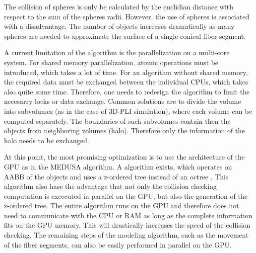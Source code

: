 The collision of spheres is only be calculated by the euclidian distance with respect to the sum of the spheres radii.
However, the use of spheres is associated with a disadvantage.
The number of objects increases dramatically as many spheres are needed to approximate the surface of a single conical fiber segment.
\par
% 
A current limitation of the algorithm is the parallelization on a multi-core system.
For shared memory parallelization, atomic operations must be introduced, which takes a lot of time.
For an algorithm without shared memory, the required data must be exchanged between the individual CPUs, which takes also quite some time. 
Therefore, one needs to redesign the algorithm to limit the necesarry locks or data exchange.
Common solutions are to divide the volume into subvolumes (as in the case of \ac{3D-PLI} simulation), where each volume can be computed separately.
The boundaries of such subvolumes contain then the objects from neighboring volumes (halo).
Therefore only the information of the halo needs to be exchanged.
\par
% 
At this point, the most promising optimization is to use the architecture of the \ac{GPU} as \eg{} in the \ac{MEDUSA} algorithm.
A algorithm exists, which operates on \ac{AABB} of the objects and uses a z-ordered tree instead of an octree \cite{Karras2012}.
This algorithm also hase the advantage that not only the collision checking computation is excecuted in parallel on the \ac{GPU}, but also the generation of the z-ordered tree.
The entire algorithm runs on the \ac{GPU} and therefore does not need to communicate with the \ac{CPU} or \ac{RAM} as long as the complete information fits on the \ac{GPU} memory.
This will drastically increases the speed of the collision checking.
The remaining steps of the modeling algorithm, such as the movement of the fiber segments, can also be easily performed in parallel on the \ac{GPU}.
% 
% 
% 
